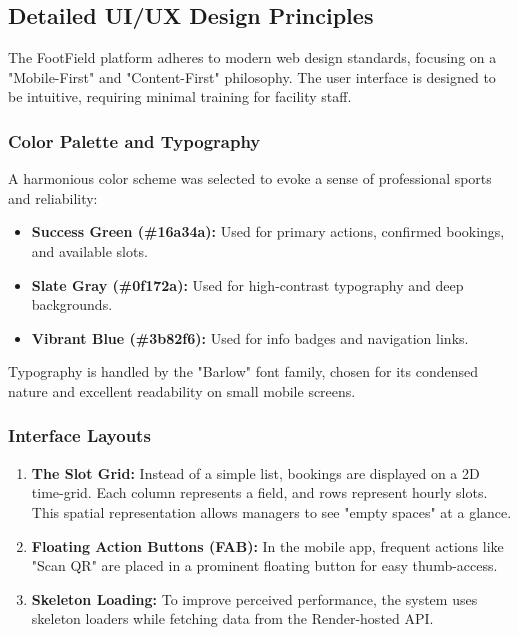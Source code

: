 \subsection{Detailed UI/UX Design Principles}
The FootField platform adheres to modern web design standards, focusing on a "Mobile-First" and "Content-First" philosophy. The user interface is designed to be intuitive, requiring minimal training for facility staff.

\subsubsection{Color Palette and Typography}
A harmonious color scheme was selected to evoke a sense of professional sports and reliability:
\begin{itemize}
    \item \textbf{Success Green (\#16a34a):} Used for primary actions, confirmed bookings, and available slots.
    \item \textbf{Slate Gray (\#0f172a):} Used for high-contrast typography and deep backgrounds.
    \item \textbf{Vibrant Blue (\#3b82f6):} Used for info badges and navigation links.
\end{itemize}
Typography is handled by the "Barlow" font family, chosen for its condensed nature and excellent readability on small mobile screens.

\subsubsection{Interface Layouts}
\begin{enumerate}
    \item \textbf{The Slot Grid:} Instead of a simple list, bookings are displayed on a 2D time-grid. Each column represents a field, and rows represent hourly slots. This spatial representation allows managers to see "empty spaces" at a glance.
    \item \textbf{Floating Action Buttons (FAB):} In the mobile app, frequent actions like "Scan QR" are placed in a prominent floating button for easy thumb-access.
    \item \textbf{Skeleton Loading:} To improve perceived performance, the system uses skeleton loaders while fetching data from the Render-hosted API.
\end{enumerate}


